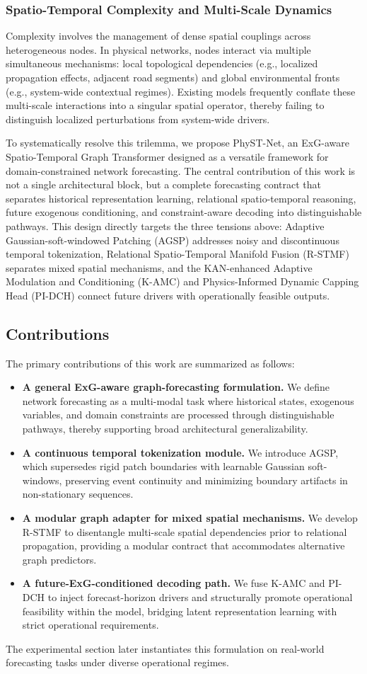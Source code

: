 \subsubsection{Spatio-Temporal Complexity and Multi-Scale Dynamics}
\label{sec:complexity}
Complexity involves the management of dense spatial couplings across heterogeneous nodes. In physical networks, nodes interact via multiple simultaneous mechanisms: local topological dependencies (e.g., localized propagation effects, adjacent road segments) and global environmental fronts (e.g., system-wide contextual regimes). Existing models frequently conflate these multi-scale interactions into a singular spatial operator, thereby failing to distinguish localized perturbations from system-wide drivers.

To systematically resolve this trilemma, we propose PhyST-Net, an ExG-aware Spatio-Temporal Graph Transformer designed as a versatile framework for domain-constrained network forecasting. The central contribution of this work is not a single architectural block, but a complete forecasting contract that separates historical representation learning, relational spatio-temporal reasoning, future exogenous conditioning, and constraint-aware decoding into distinguishable pathways. This design directly targets the three tensions above: Adaptive Gaussian-soft-windowed Patching (AGSP) addresses noisy and discontinuous temporal tokenization, Relational Spatio-Temporal Manifold Fusion (R-STMF) separates mixed spatial mechanisms, and the KAN-enhanced Adaptive Modulation and Conditioning (K-AMC) and Physics-Informed Dynamic Capping Head (PI-DCH) connect future drivers with operationally feasible outputs.

\subsection{Contributions}
\label{sec:contributions}
The primary contributions of this work are summarized as follows:
\begin{itemize}
    \item \textbf{A general ExG-aware graph-forecasting formulation.} We define network forecasting as a multi-modal task where historical states, exogenous variables, and domain constraints are processed through distinguishable pathways, thereby supporting broad architectural generalizability.
    \item \textbf{A continuous temporal tokenization module.} We introduce AGSP, which supersedes rigid patch boundaries with learnable Gaussian soft-windows, preserving event continuity and minimizing boundary artifacts in non-stationary sequences.
    \item \textbf{A modular graph adapter for mixed spatial mechanisms.} We develop R-STMF to disentangle multi-scale spatial dependencies prior to relational propagation, providing a modular contract that accommodates alternative graph predictors.
    \item \textbf{A future-ExG-conditioned decoding path.} We fuse K-AMC and PI-DCH to inject forecast-horizon drivers and structurally promote operational feasibility within the model, bridging latent representation learning with strict operational requirements.
\end{itemize}

The experimental section later instantiates this formulation on real-world forecasting tasks under diverse operational regimes.
